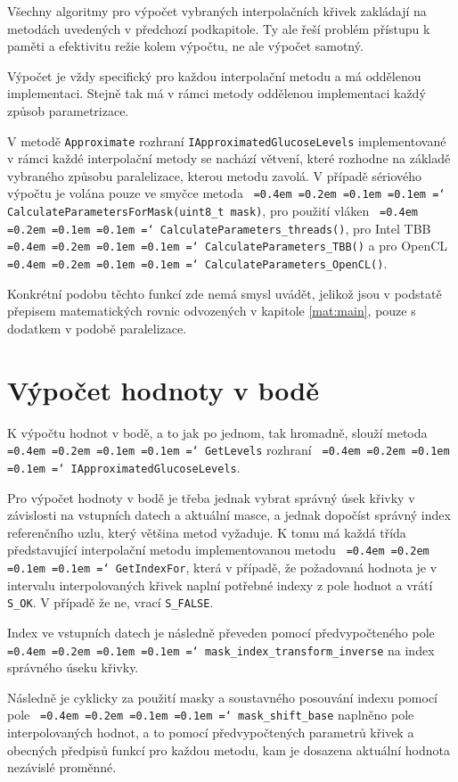 \documentclass[]{thesiskiv}
\newcommand*\justify{
  \fontdimen2\font=0.4em
  \fontdimen3\font=0.2em
  \fontdimen4\font=0.1em
  \fontdimen7\font=0.1em
  \hyphenchar\font=`\-
}
\begin{document}
Všechny algoritmy pro výpočet vybraných interpolačních křivek zakládají na metodách uvedených v předchozí podkapitole. Ty ale řeší problém přístupu k paměti a efektivitu režie kolem výpočtu, ne ale výpočet samotný.

Výpočet je vždy specifický pro každou interpolační metodu a má oddělenou implementaci. Stejně tak má v rámci metody oddělenou implementaci každý způsob parametrizace.

V metodě \texttt{Approximate} rozhraní \texttt{IApproximatedGlucoseLevels} implementované v rámci každé interpolační metody se nachází větvení, které rozhodne na základě vybraného způsobu paralelizace, kterou metodu zavolá. V případě sériového výpočtu je volána pouze ve smyčce metoda \texttt{\justify CalculateParametersForMask(uint8\_t mask)}, pro použití vláken \texttt{\justify CalculateParameters\_threads()}, pro Intel TBB \texttt{\justify CalculateParameters\_TBB()} a pro OpenCL \texttt{\justify CalculateParameters\_OpenCL()}.

Konkrétní podobu těchto funkcí zde nemá smysl uvádět, jelikož jsou v podstatě přepisem matematických rovnic odvozených v kapitole \ref{mat:main}, pouze s dodatkem v podobě paralelizace.

\section{Výpočet hodnoty v bodě}

K výpočtu hodnot v bodě, a to jak po jednom, tak hromadně, slouží metoda \texttt{\justify GetLevels} rozhraní \texttt{\justify IApproximatedGlucoseLevels}.

Pro výpočet hodnoty v bodě je třeba jednak vybrat správný úsek křivky v závislosti na vstupních datech a aktuální masce, a jednak dopočíst správný index referenčního uzlu, který většina metod vyžaduje. K tomu má každá třída představující interpolační metodu implementovanou metodu \texttt{\justify GetIndexFor}, která v případě, že požadovaná hodnota je v intervalu interpolovaných křivek naplní potřebné indexy z pole hodnot a vrátí \texttt{S\_OK}. V případě že ne, vrací \texttt{S\_FALSE}.

Index ve vstupních datech je následně převeden pomocí předvypočteného pole \texttt{\justify mask\_index\_transform\_inverse} na index správného úseku křivky.

Následně je cyklicky za použití masky a soustavného posouvání indexu pomocí pole \texttt{\justify mask\_shift\_base} naplněno pole interpolovaných hodnot, a to pomocí předvypočtených parametrů křivek a obecných předpisů funkcí pro každou metodu, kam je dosazena aktuální hodnota nezávislé proměnné.
\end{document}
